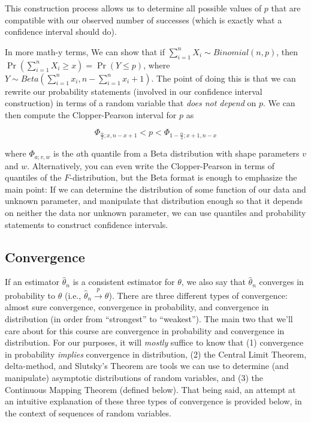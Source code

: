 \documentclass[
  letterpaper,
  DIV=11,
  numbers=noendperiod]{scrreprt}
\begin{document}
This construction process allows us to determine all possible values of
\(p\) that are compatible with our observed number of successes (which
is exactly what a confidence interval should do).

In more math-y terms, We can show that if
\(\sum_{i = 1}^n X_i \sim Binomial(n, p)\), then
\(\Pr(\sum_{i = 1}^n X_i \geq x) = \Pr(Y \leq p)\), where
\(Y \sim Beta(\sum_{i = 1}^n x_i, n - \sum_{i = 1}^n x_i + 1)\). The
point of doing this is that we can rewrite our probability statements
(involved in our confidence interval construction) in terms of a random
variable that \emph{does not depend} on \(p\). We can then compute the
Clopper-Pearson interval for \(p\) as

\[
\Phi_{\frac{\alpha}{2}; x, n - x + 1} < p < \Phi_{1 - \frac{\alpha}{2}; x + 1, n - x}
\]

where \(\Phi_{a; v, w}\) is the \(a\)th quantile from a Beta
distribution with shape parameters \(v\) and \(w\). Alternatively, you
can even write the Clopper-Pearson in terms of quantiles of the
\(F\)-distribution, but the Beta format is enough to emphasize the main
point: If we can determine the distribution of some function of our data
and unknown parameter, and manipulate that distribution enough so that
it depends on neither the data nor unknown parameter, we can use
quantiles and probability statements to construct confidence intervals.

\subsection*{Convergence}\label{convergence}

If an estimator \(\hat{\theta}_n\) is a consistent estimator for
\(\theta\), we also say that \(\hat{\theta}_n\) converges in probability
to \(\theta\) (i.e., \(\hat{\theta}_n \overset{p}{\to} \theta\)). There
are three different types of convergence: almost sure convergence,
convergence in probability, and convergence in distribution (in order
from ``strongest'' to ``weakest''). The main two that we'll care about
for this course are convergence in probability and convergence in
distribution. For our purposes, it will \emph{mostly} suffice to know
that (1) convergence in probability \emph{implies} convergence in
distribution, (2) the Central Limit Theorem, delta-method, and Slutsky's
Theorem are tools we can use to determine (and manipulate) asymptotic
distributions of random variables, and (3) the Continuous Mapping
Theorem (defined below). That being said, an attempt at an intuitive
explanation of these three types of convergence is provided below, in
the context of sequences of random variables.
\end{document}
